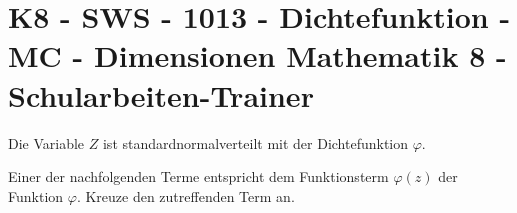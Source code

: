 \section{K8 - SWS - 1013 - Dichtefunktion - MC - Dimensionen Mathematik 8 - Schularbeiten-Trainer}

\begin{beispiel}[K8 - SWS]{1}
Die Variable $Z$ ist standardnormalverteilt mit der Dichtefunktion $\varphi$.

Einer der nachfolgenden Terme entspricht dem Funktionsterm $\varphi(z)$ der Funktion $\varphi$. Kreuze den zutreffenden Term an.

\end{beispiel}